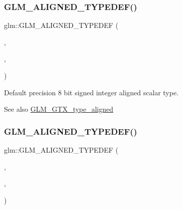 \subsubsection{\texorpdfstring{G\+L\+M\+\_\+\+A\+L\+I\+G\+N\+E\+D\+\_\+\+T\+Y\+P\+E\+D\+E\+F()}{GLM\_ALIGNED\_TYPEDEF()}\hspace{0.1cm}{\footnotesize\ttfamily [37/209]}}
{\footnotesize\ttfamily glm\+::\+G\+L\+M\+\_\+\+A\+L\+I\+G\+N\+E\+D\+\_\+\+T\+Y\+P\+E\+D\+EF (\begin{DoxyParamCaption}\item[{\hyperlink{group__gtc__type__precision_ga96254f9c1c4506fc8eb5cf3301ce8565}{int8}}]{,  }\item[{aligned\+\_\+int8}]{,  }\item[{1}]{ }\end{DoxyParamCaption})}

Default precision 8 bit signed integer aligned scalar type. \begin{DoxySeeAlso}{See also}
\hyperlink{group__gtx__type__aligned}{G\+L\+M\+\_\+\+G\+T\+X\+\_\+type\+\_\+aligned} 
\end{DoxySeeAlso}
\mbox{\label{group__gtx__type__aligned_ga285649744560be21000cfd81bbb5d507}} 
\subsubsection{\texorpdfstring{G\+L\+M\+\_\+\+A\+L\+I\+G\+N\+E\+D\+\_\+\+T\+Y\+P\+E\+D\+E\+F()}{GLM\_ALIGNED\_TYPEDEF()}\hspace{0.1cm}{\footnotesize\ttfamily [38/209]}}
{\footnotesize\ttfamily glm\+::\+G\+L\+M\+\_\+\+A\+L\+I\+G\+N\+E\+D\+\_\+\+T\+Y\+P\+E\+D\+EF (\begin{DoxyParamCaption}\item[{\hyperlink{group__gtc__type__precision_ga2945a61d12771f8954994fcddf02b021}{int16}}]{,  }\item[{aligned\+\_\+int16}]{,  }\item[{2}]{ }\end{DoxyParamCaption})}

